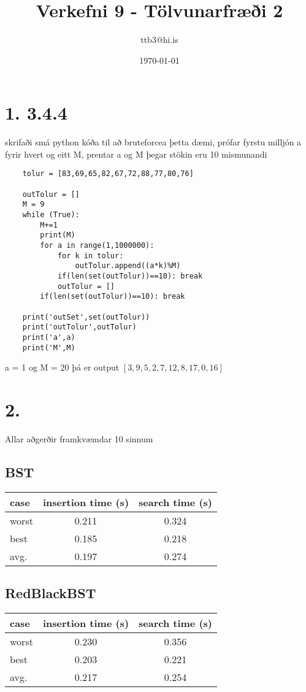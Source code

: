 \documentclass{article}
\title{Verkefni 9 - Tölvunarfræði 2}
\author{ttb3@hi.is}
\date{\today}
\begin{document}
\maketitle


\section*{1. 3.4.4}
skrifaði smá python kóða til að bruteforcea þetta dæmi, prófar fyrstu milljón a fyrir hvert og eitt M,
prentar a og M þegar stökin eru 10 mismunandi
\begin{lstlisting}
    tolur = [83,69,65,82,67,72,88,77,80,76]

    outTolur = []
    M = 9
    while (True):
        M+=1
        print(M)
        for a in range(1,1000000):
            for k in tolur:
                outTolur.append((a*k)%M)
            if(len(set(outTolur))==10): break
            outTolur = []
        if(len(set(outTolur))==10): break

    print('outSet',set(outTolur))
    print('outTolur',outTolur)
    print('a',a)
    print('M',M)
\end{lstlisting}
a = 1 og M = 20
þá er output $[3, 9, 5, 2, 7, 12, 8, 17, 0, 16]$

\newpage
\section*{2.}
Allar aðgerðir framkvæmdar 10 sinnum
\subsection*{BST}
\begin{tabular}{|l|c|c|}
    \hline
    case&insertion time (s)&search time (s)\\
    \hline
    worst&0.211&0.324\\
    \hline
    best&0.185&0.218\\
    \hline
    avg.&0.197&0.274\\
    \hline
\end{tabular}

\subsection*{RedBlackBST}
\begin{tabular}{|l|c|c|}
    \hline
    case&insertion time (s)&search time (s)\\
    \hline
    worst&0.230&0.356\\
    \hline
    best&0.203&0.221\\
    \hline
    avg.&0.217&0.254\\
    \hline
\end{tabular}
\end{document}
